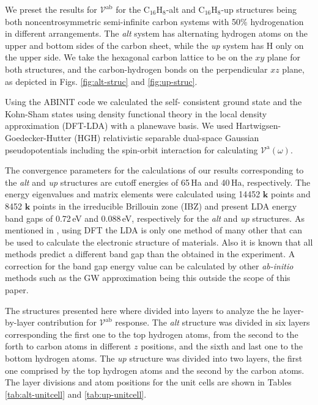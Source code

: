 \documentclass[prb,11pt,tightenlines,twocolumn,aps]{revtex4-1}
\begin{document}
We preset the results for $\mathcal{V}^{\mathrm{ab}}$ for the
C$_{16}$H$_{8}$-alt and C$_{16}$H$_{8}$-up structures being both
noncentrosymmetric semi-infinite carbon systems with 50\% hydrogenation in
different arrangements. The \emph{alt} system has alternating hydrogen atoms on
the upper and bottom sides of the carbon sheet, while the \emph{up} system has H
only on the upper side. We take the hexagonal carbon lattice to be on the $xy$
plane for both structures, and the carbon-hydrogen bonds on the perpendicular
$xz$ plane, as depicted in Figs.
\ref{fig:alt-struc} and \ref{fig:up-struc}.

Using the ABINIT code \cite{gonzeCPC09} we calculated the self- consistent
ground state and the Kohn-Sham states using density functional theory in the
local density approximation (DFT-LDA) with a planewave basis. We used
Hartwigsen- Goedecker-Hutter (HGH) relativistic separable dual-space Gaussian
pseudopotentials \cite{hartwigsenPRB98} including the spin-orbit interaction
for calculating $\mathcal{V}^{\mathrm{a}}(\omega)$.

The convergence parameters for the calculations of our results corresponding to
the \emph{alt} and \emph{up} structures are cutoff energies of 65\,Ha and
40\,Ha, respectively. The energy eigenvalues and matrix elements were
calculated using 14452 $\mathbf{k}$ points and 8452 $\mathbf{k}$ points in the
irreducible Brillouin zone (IBZ) and present LDA energy band gaps of 0.72\,eV
and 0.088\,eV, respectively for the \emph{alt} and \emph{up} structures. As
mentioned in
\cite{zapataPSB2016}, using DFT the LDA is only one method of many other that
can be used to calculate the electronic structure of materials. Also it is
known that all methods predict a different band gap than the obtained in the
experiment. A correction for the band gap energy value can be calculated by
other \emph{ab-initio} methods such as the GW approximation \cite{onidaRMP02}
being this outside the scope of this paper.

The structures presented here where divided into layers to analyze the he
layer-by-layer contribution for $\mathcal{V}^{\mathrm{ab}}$ response. The
\emph{alt} structure was divided in six layers corresponding the first one to
the top hydrogen atoms, from the second to the forth to carbon atoms in
different $z$ positions, and the sixth and last one to the bottom hydrogen
atoms. The \emph{up} structure was divided into two layers, the first one
comprised by the top hydrogen atoms and the second by the carbon atoms. The
layer divisions and atom positions for the unit cells are shown in Tables
\ref{tab:alt-unitcell} and \ref{tab:up-unitcell}.
\end{document}
